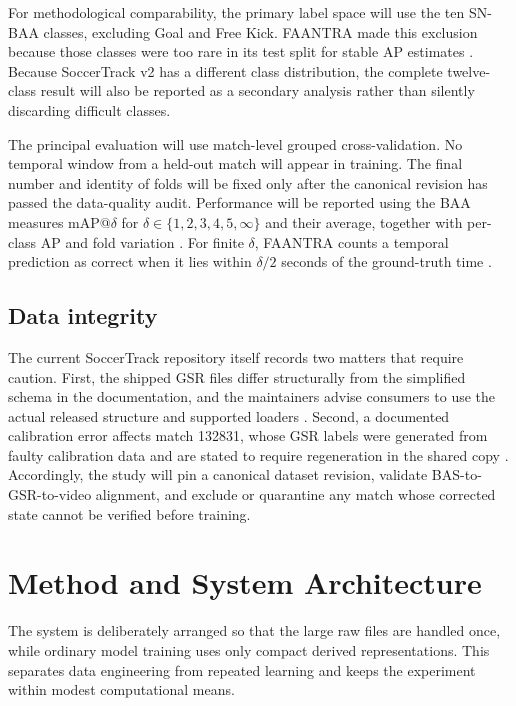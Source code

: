 \documentclass[11pt,a4paper]{article}
\begin{document}
For methodological comparability, the primary label space will use the ten SN-BAA classes, excluding Goal and Free Kick. FAANTRA made this exclusion because those classes were too rare in its test split for stable AP estimates \cite{dalal2025faantra}. Because SoccerTrack v2 has a different class distribution, the complete twelve-class result will also be reported as a secondary analysis rather than silently discarding difficult classes.

The principal evaluation will use match-level grouped cross-validation. No temporal window from a held-out match will appear in training. The final number and identity of folds will be fixed only after the canonical revision has passed the data-quality audit. Performance will be reported using the BAA measures mAP@$\delta$ for $\delta\in\{1,2,3,4,5,\infty\}$ and their average, together with per-class AP and fold variation \cite{dalal2025faantra,cioppa2026}. For finite $\delta$, FAANTRA counts a temporal prediction as correct when it lies within $\delta/2$ seconds of the ground-truth time \cite{dalal2025faantra}.

\subsection{Data integrity}

The current SoccerTrack repository itself records two matters that require caution. First, the shipped GSR files differ structurally from the simplified schema in the documentation, and the maintainers advise consumers to use the actual released structure and supported loaders \cite{soccertrackGSR}. Second, a documented calibration error affects match 132831, whose GSR labels were generated from faulty calibration data and are stated to require regeneration in the shared copy \cite{soccertrackCorrection}. Accordingly, the study will pin a canonical dataset revision, validate BAS-to-GSR-to-video alignment, and exclude or quarantine any match whose corrected state cannot be verified before training.

\section{Method and System Architecture}

The system is deliberately arranged so that the large raw files are handled once, while ordinary model training uses only compact derived representations. This separates data engineering from repeated learning and keeps the experiment within modest computational means.
\end{document}
